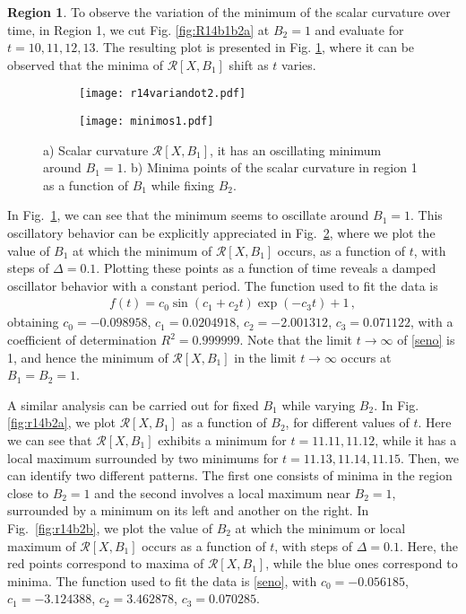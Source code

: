 \documentclass[12pt]{iopart}
\begin{document}
{\bf {Region 1}}. To observe the variation of the minimum of the scalar curvature over time, in Region 1, we cut Fig. \ref{fig:R14b1b2a} at $B_2=1$ and evaluate for $t=10,11,12,13$. The resulting plot is presented in Fig. \ref{fig:r14ta}, where it can be observed that the minima of $\mathcal{R}[X, B_1]$  shift as $t$ varies.


\begin{figure}[H]
  \centering
    \begin{subfigure}{0.45\linewidth}\texttt{[image: r14variandot2.pdf]}
    \caption{}
    \label{fig:r14ta}
  \end{subfigure}
  \begin{subfigure}{0.45\linewidth}\texttt{[image: minimos1.pdf]}
  \caption{}
  \label{fig:r14tb} 
  \end{subfigure}
  \captionsetup{font=small} 
  \caption{\justifying a)  Scalar curvature $\mathcal{R}[X,B_1]$, it has an oscillating minimum around $B_1=1$. b) Minima points of the scalar curvature in region 1 as a function of $B_1$ while fixing $B_2$. }  
   \label{fig:r14t}
\end{figure}

In Fig.~\ref{fig:r14ta}, we can see that the minimum seems to oscillate around $B_1=1$. This oscillatory behavior can be explicitly appreciated in Fig.~\ref{fig:r14tb}, where we plot the value of $B_1$ at which the minimum of  $\mathcal{R}[X, B_1]$ occurs, as a function of $t$, with steps of $\Delta=0.1$. Plotting these points as a function of time reveals a damped oscillator behavior with a constant period. The function used to fit the data is
\begin{align}
    f(t)=c_0\sin{(c_1 +c_2 t)}\exp(-c_3t)+1\,,
    \label{seno}
\end{align}
obtaining $c_0= -0.098958$, $c_1=  0.0204918$, $c_2 = -2.001312$, $c_3 = 0.071122$, with a coefficient of determination $R^2=0.999999$. Note that the limit $t\to\infty$ of \eqref{seno} is 1, and  hence the minimum of $\mathcal{R}[X,B_1]$ in the limit $t\to \infty$ occurs at $B_1=B_2=1$. 

A similar analysis can be carried out for fixed  $B_1$ while varying $B_2$. In Fig. \ref{fig:r14b2a}, we plot $\mathcal{R}[X, B_1]$ as a function of $B_2$, for different values of $t$. Here we can see that $\mathcal{R}[X, B_1]$ exhibits a minimum for  $t=11.11, 11.12$, while it has a local maximum surrounded by two minimums for $t=11.13,11.14,11.15$. Then, we can identify two different patterns. The first one consists of minima in the region close to $B_2=1$ and the second involves a local maximum near $B_2=1$, surrounded by a minimum on its left and another on the right. In Fig.~\ref{fig:r14b2b}, we plot the value of $B_2$ at which the minimum or local maximum of  $\mathcal{R}[X, B_1]$ occurs as a function of $t$, with steps of $\Delta=0.1$. Here, the red points correspond to maxima of $\mathcal{R}[X, B_1]$, while the blue ones correspond to minima. The function used to fit the data is \eqref{seno}, with $c_0 =-0.056185$, $c_1 = -3.124388$, $c_2 =3.462878$, $c_3 =  0.070285$.
\end{document}
